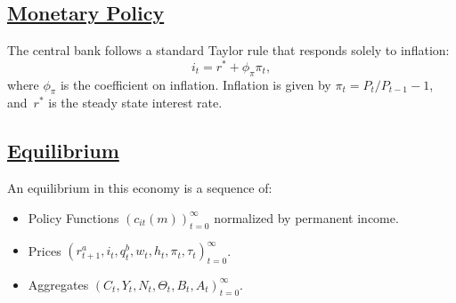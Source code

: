 \documentclass[\latexroot/\projectname]{subfiles}
\begin{document}
\subsection{\href{https://econ-ark.github.io/HAFiscal/\#sec:hank-monetary-policy}{Monetary Policy}}\whenintegrated{\label{sec:hank-monetary-policy}}

The central bank follows a standard Taylor rule that responds solely to inflation:
\[
  i_{t} = r^{*} +\phi_{\pi} \pi_{t},
\]
where $\phi_{\pi}$ is the coefficient on inflation. Inflation is given by $\pi_t = P_t/P_{t-1}-1$, and~$r^{*}$ is the steady state interest rate.

\subsection{\href{https://econ-ark.github.io/HAFiscal/\#sec:hank-equilibrium}{Equilibrium}}\whenintegrated{\label{sec:hank-equilibrium}}

An equilibrium in this economy is a sequence of:
\begin{itemize}[label=--]
  \item
        Policy Functions ${\left( c_{it}(m) \right )}_{t=0}^{\infty}$ normalized by permanent income.
  \item
        Prices $ {\left( r^{a}_{t+1}, i_{t}, q^{b}_{t},  w_{t}, h_{t} , \pi_{t} , \tau_{t} \right) }_{t=0}^{\infty}$.
  \item
        Aggregates $ {\left(C_{t}, Y_{t} , N_{t},   \Theta_{t},  B_{t} , A_{t}  \right)}_{t=0}^{\infty}$.
\end{itemize}
\end{document}
